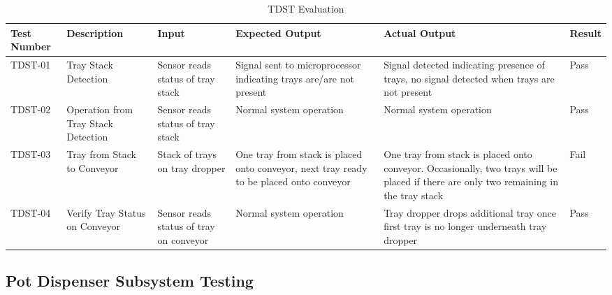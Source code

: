 \documentclass[12pt, titlepage]{article}
\begin{document}
\begin{longtable}{ |p{}|*{4}{>{\centering\arraybackslash}p{}|}p{}|  }
  \caption{TDST Evaluation}
  \label{tab:TDST}\\
    \hline
    Test Number & Description & Input & Expected Output & Actual Output & Result\\
    \hline
    TDST-01 & Tray Stack Detection & Sensor reads status of tray stack & Signal sent to microprocessor indicating trays are/are not present & Signal detected indicating presence of trays, no signal detected when trays are not present & Pass\\
    \hline
    TDST-02 & Operation from Tray Stack Detection & Sensor reads status of tray stack & Normal system operation & Normal system operation & Pass\\
    \hline
    TDST-03 & Tray from Stack to Conveyor & Stack of trays on tray dropper & One tray from stack is placed onto conveyor, next tray ready to be placed onto conveyor & One tray from stack is placed onto conveyor. Occasionally, two trays will be placed if there are only two remaining in the tray stack & Fail\\
    \hline
    TDST-04 & Verify Tray Status on Conveyor & Sensor reads status of tray on conveyor & Normal system operation & Tray dropper drops additional tray once first tray is no longer underneath tray dropper & Pass\\
    \hline
    
\end{longtable}

\subsection{Pot Dispenser Subsystem Testing}
\end{document}
